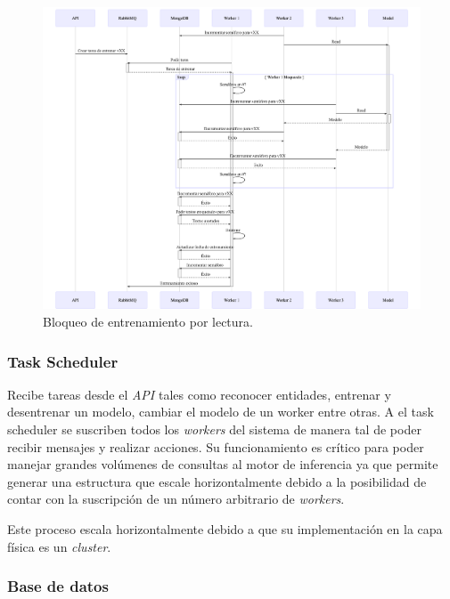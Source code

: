 \documentclass[12pt,a4paper,]{scrartcl}
\begin{document}
\begin{figure}[H]

{\centering \includegraphics{assets/mermaid/scenarios-worker-train.png} 

}

\caption{Bloqueo de entrenamiento por lectura.}\label{fig:scenarios-worker-train}
\end{figure}

\hypertarget{task-scheduler}{%
\subsubsection{Task Scheduler}\label{task-scheduler}}

Recibe tareas desde el \emph{API} tales como reconocer entidades, entrenar y desentrenar un modelo, cambiar el modelo de un worker entre otras. A el task scheduler se suscriben todos los \emph{workers} del sistema de manera tal de poder recibir mensajes y realizar acciones.
Su funcionamiento es crítico para poder manejar grandes volúmenes de consultas al motor de inferencia ya que permite generar una estructura que escale horizontalmente debido a la posibilidad de contar con la suscripción de un número arbitrario de \emph{workers}.

Este proceso escala horizontalmente debido a que su implementación en la capa física es un \emph{cluster}.

\hypertarget{base-de-datos}{%
\subsubsection{Base de datos}\label{base-de-datos}}
\end{document}
